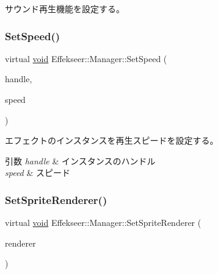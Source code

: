 サウンド再生機能を設定する。 

\mbox{\label{class_effekseer_1_1_manager_aa85b08562c442cfdce24781158a71431}} 
\subsubsection{\texorpdfstring{Set\+Speed()}{SetSpeed()}}
{\footnotesize\ttfamily virtual \mbox{\hyperlink{namespace_effekseer_ab34c4088e512200cf4c2716f168deb56}{void}} Effekseer\+::\+Manager\+::\+Set\+Speed (\begin{DoxyParamCaption}\item[{\mbox{\hyperlink{namespace_effekseer_afba58b8d812da862190e9bbfc040824a}{Handle}}}]{handle,  }\item[{float}]{speed }\end{DoxyParamCaption})\hspace{0.3cm}{\ttfamily [pure virtual]}}



エフェクトのインスタンスを再生スピードを設定する。 


\begin{DoxyParams}{引数}
{\em handle} & インスタンスのハンドル \\
\hline
{\em speed} & スピード \\
\hline
\end{DoxyParams}
\mbox{\label{class_effekseer_1_1_manager_a1b4f22221e7068d6604c18aa4ca4b80e}} 
\subsubsection{\texorpdfstring{Set\+Sprite\+Renderer()}{SetSpriteRenderer()}}
{\footnotesize\ttfamily virtual \mbox{\hyperlink{namespace_effekseer_ab34c4088e512200cf4c2716f168deb56}{void}} Effekseer\+::\+Manager\+::\+Set\+Sprite\+Renderer (\begin{DoxyParamCaption}\item[{\mbox{\hyperlink{class_effekseer_1_1_sprite_renderer}{Sprite\+Renderer}} $\ast$}]{renderer }\end{DoxyParamCaption})\hspace{0.3cm}{\ttfamily [pure virtual]}}



